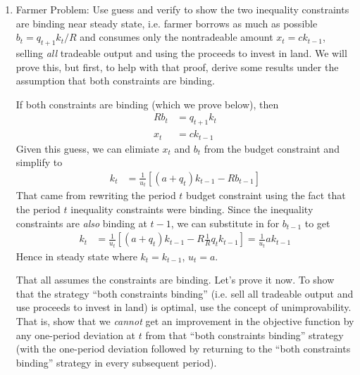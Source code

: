 \documentclass[12pt]{article}
\theoremstyle{plain}
\theoremstyle{definition}
\theoremstyle{remark}
\begin{document}
\begin{enumerate}
  \item Farmer Problem:
    Use guess and verify to show the two inequality constraints are
    binding near steady state, i.e. farmer borrows as much as possible
    $b_t=q_{t+1}k_t/R$ and consumes only the nontradeable amount
    $x_t=ck_{t-1}$, selling \emph{all} tradeable output and using the
    proceeds to invest in land.
    We will prove this, but first, to help with that proof,  derive
    some results under the assumption that both constraints are binding.

    If both constraints are binding (which we prove below), then
    \begin{align*}
      Rb_t &= q_{t+1}k_t
      \\
      x_t &= ck_{t-1}
    \end{align*}
    Given this guess, we can elimiate $x_t$ and $b_t$ from the budget
    constraint and simplify to
    \begin{align*}
      k_t
      &=
      \frac{1}{u_t}
      [
      (a+q_t)k_{t-1}
      - Rb_{t-1}
      ]
    \end{align*}
    That came from rewriting the period $t$ budget constraint using the
    fact that the period $t$ inequality constraints were binding. Since
    the inequality constraints are \emph{also} binding at $t-1$, we can
    substitute in for $b_{t-1}$ to get
    \begin{align*}
      k_t
      &=
      \frac{1}{u_t}
      [
      (a+q_t)k_{t-1}
      - R\frac{1}{R}q_tk_{t-1}
      ]
      =
      \frac{1}{u_t}
      ak_{t-1}
    \end{align*}
    Hence in steady state where $k_t=k_{t-1}$, $u_t=a$.

    That all assumes the constraints are binding. Let's prove it now.
    To show that the strategy ``both constraints binding'' (i.e. sell
    all tradeable output and use proceeds to invest in land) is optimal,
    use the concept of unimprovability. That is, show that we
    \emph{cannot} get an improvement in the objective function by any
    one-period deviation at $t$ from that ``both constraints binding''
    strategy (with the one-period deviation followed by returning to the
    ``both constraints binding'' strategy in every subsequent period).


\end{enumerate}
\end{document}
